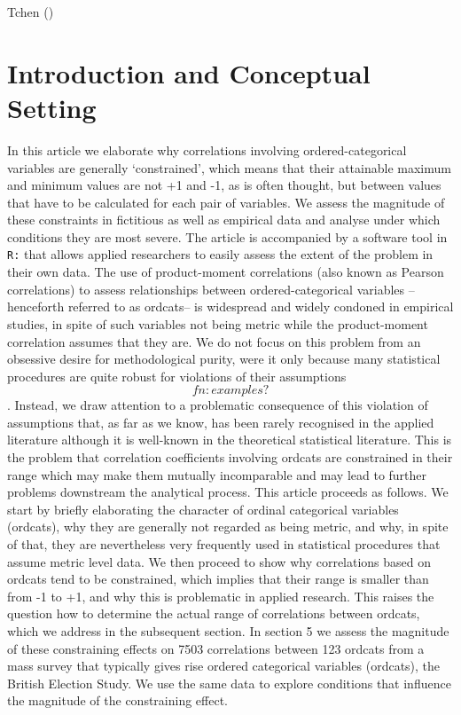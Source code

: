 \documentclass[
  12pt,
]{article}
\theoremstyle{plain}
\theoremstyle{definition}
\theoremstyle{remark}
\begin{document}
Tchen ()

\newpage

\section{Introduction and Conceptual
Setting}\label{introduction-and-conceptual-setting}

In this article we elaborate why correlations involving
ordered-categorical variables are generally `constrained', which means
that their attainable maximum and minimum values are not +1 and -1, as
is often thought, but between values that have to be calculated for each
pair of variables. We assess the magnitude of these constraints in
fictitious as well as empirical data and analyse under which conditions
they are most severe. The article is accompanied by a software tool in
\texttt{R:} that allows applied researchers to easily assess the extent
of the problem in their own data. The use of product-moment correlations
(also known as Pearson correlations) to assess relationships between
ordered-categorical variables --henceforth referred to as ordcats-- is
widespread and widely condoned in empirical studies, in spite of such
variables not being metric while the product-moment correlation assumes
that they are. We do not focus on this problem from an obsessive desire
for methodological purity, were it only because many statistical
procedures are quite robust for violations of their assumptions
\[fn: examples?\] . Instead, we draw attention to a problematic
consequence of this violation of assumptions that, as far as we know,
has been rarely recognised in the applied literature although it is
well-known in the theoretical statistical literature. This is the
problem that correlation coefficients involving ordcats are constrained
in their range which may make them mutually incomparable and may lead to
further problems downstream the analytical process. This article
proceeds as follows. We start by briefly elaborating the character of
ordinal categorical variables (ordcats), why they are generally not
regarded as being metric, and why, in spite of that, they are
nevertheless very frequently used in statistical procedures that assume
metric level data. We then proceed to show why correlations based on
ordcats tend to be constrained, which implies that their range is
smaller than from -1 to +1, and why this is problematic in applied
research. This raises the question how to determine the actual range of
correlations between ordcats, which we address in the subsequent
section. In section 5 we assess the magnitude of these constraining
effects on 7503 correlations between 123 ordcats from a mass survey that
typically gives rise ordered categorical variables (ordcats), the
British Election Study. We use the same data to explore conditions that
influence the magnitude of the constraining effect.
\end{document}
